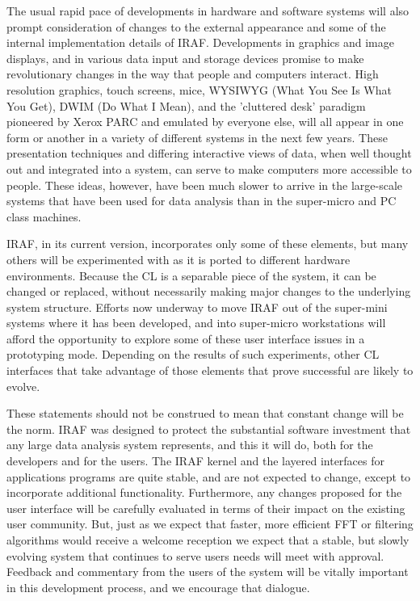 The usual rapid pace of developments in hardware and software systems 
will also prompt consideration of changes to the external appearance
and some of the internal implementation details of IRAF.
Developments in graphics and image displays, and in various data
input and storage
devices promise to make revolutionary changes in the way that
people and computers interact. High resolution graphics, touch screens,
mice, WYSIWYG (What You See Is What You Get), DWIM (Do What I Mean),
and the 'cluttered desk' paradigm pioneered by Xerox PARC and emulated
by everyone else, will all appear in one form or another in a variety
of different systems in the next few years.  These presentation
techniques and differing interactive views of data,
when well thought out and integrated into a system,
can serve to make computers more accessible to people.  
These ideas, however, have been much slower to arrive in the 
large-scale systems that have been used for data analysis than in
the super-micro and PC class machines. 

IRAF, in its current version, incorporates only some of these elements,
but many others will be experimented with as it is ported to
different hardware environments.  
Because the CL is a separable piece of the system, 
it can be changed or replaced, without necessarily making major changes
to the underlying system structure.  Efforts now underway to move
IRAF out of the super-mini systems where it has been developed, and
into super-micro workstations will afford the opportunity to
explore some of these user interface issues in a prototyping 
mode.  Depending on the results of such experiments,
other CL interfaces that take advantage of those
elements that prove successful are likely to evolve.  

These statements should not be
construed to mean that constant change will be the norm.  IRAF
was designed to protect the substantial software investment that any 
large data analysis system represents, and this it will do, both for
the developers and for the users.  The IRAF kernel and the layered
interfaces for applications programs are quite stable, and are not
expected to change, except to incorporate additional functionality.
Furthermore, any changes proposed for
the user interface will be carefully evaluated in terms of their
impact on the existing user community.  But, just as we expect that
faster, more efficient FFT or filtering algorithms would receive
a welcome reception we expect that a stable, but slowly evolving system 
that continues to serve
users needs will meet with approval.  Feedback and commentary from the
users of the system will be vitally important in this development
process, and we encourage that dialogue.

